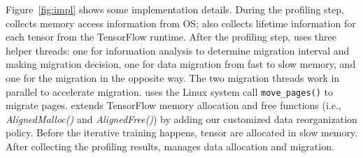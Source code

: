 

Figure~\ref{fig:impl} shows some implementation details. \textcolor{check}{During the profiling step, \name collects memory access information from OS; \name also collects lifetime information for each tensor from the TensorFlow runtime. After the profiling step,}  \name uses three helper threads: one for information analysis to determine migration interval and making migration decision, one for data migration from fast to slow memory, and one for the migration in the opposite way. The two migration threads work in parallel to accelerate migration. \name uses the Linux system call \texttt{move\_pages()} to migrate pages. \textcolor{check}{
\name extends TensorFlow memory allocation and free functions (i.e., \textit{AlignedMalloc()} and \textit{AlignedFree()}) by adding our customized data reorganization policy. Before the iterative training happens, tensor are allocated in slow memory. After collecting the profiling results, \name manages data allocation and migration.}



